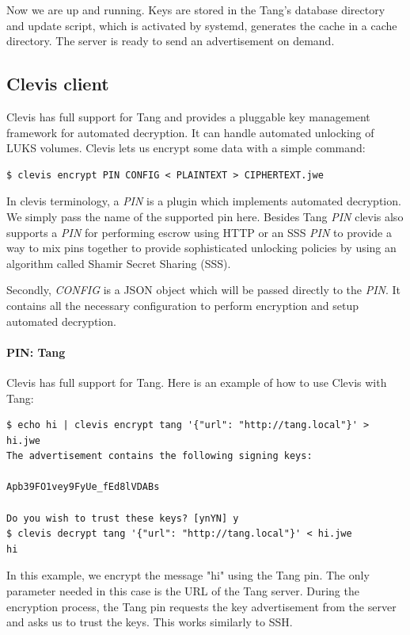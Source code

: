 Now we are up and running.
Keys are stored in the Tang's database directory and update script, which is activated by systemd, generates the cache in a cache directory.
The server is ready to send an advertisement on demand.



\subsection{Clevis client}\label{clevis}

Clevis has full support for Tang and provides a pluggable key management framework for automated decryption.
It can handle automated unlocking of LUKS volumes.
Clevis lets us encrypt some data with a simple command:
\begin{lstlisting}[columns=fixed,basicstyle=\ttfamily\footnotesize,tabsize=4,backgroundcolor=\color{yellow!10}]
$ clevis encrypt PIN CONFIG < PLAINTEXT > CIPHERTEXT.jwe
\end{lstlisting}
In clevis terminology, a {\it PIN} is a plugin which implements automated decryption.
We simply pass the name of the supported pin here.
Besides Tang {\it PIN} clevis also supports a {\it PIN} for performing escrow using HTTP or an SSS {\it PIN} to provide a way to mix pins together to provide sophisticated unlocking policies by using an algorithm called Shamir Secret Sharing (SSS).%

Secondly, {\it CONFIG} is a JSON object which will be passed directly to the {\it PIN}.
It contains all the necessary configuration to perform encryption and setup automated decryption.


\paragraph{PIN: Tang}
Clevis has full support for Tang.
Here is an example of how to use Clevis with Tang:
\begin{lstlisting}[columns=fixed,basicstyle=\ttfamily\footnotesize,tabsize=4,backgroundcolor=\color{yellow!10}]
$ echo hi | clevis encrypt tang '{"url": "http://tang.local"}' > hi.jwe
The advertisement contains the following signing keys:

Apb39FO1vey9FyUe_fEd8lVDABs

Do you wish to trust these keys? [ynYN] y
$ clevis decrypt tang '{"url": "http://tang.local"}' < hi.jwe
hi
\end{lstlisting}
In this example, we encrypt the message "hi" using the Tang pin.
The only parameter needed in this case is the URL of the Tang server.
During the encryption process, the Tang pin requests the key advertisement from the server and asks us to trust the keys.
This works similarly to SSH.


